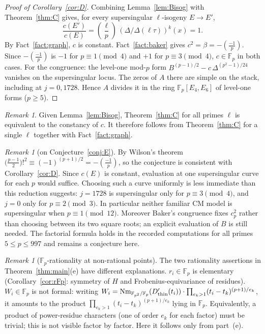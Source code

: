 \documentclass[11pt,a4paper]{article}
\numberwithin{equation}{section}
\theoremstyle{definition}
\theoremstyle{remark}
\newtheorem{remark}[theorem]{Remark}
\newcommand{\Fp}{\mathbb F_p}
\newcommand{\Fq}{\mathbb F_{p^2}}
\newcommand{\Lp}[1]{\left(\frac{#1}{p}\right)}
\begin{document}
\begin{proof}[Proof of Corollary~\ref{cor:D}]
Combining Lemma~\ref{lem:Bisog} with Theorem~\ref{thm:C} gives, for every supersingular
$\ell$-isogeny $E\to E'$,
\[
\frac{c(E')}{c(E)}=\Lp\ell\,(\Delta/\Delta(\ell\tau))^k(x)=1.
\]
By Fact~\ref{fact:graph}, $c$ is constant. Fact~\ref{fact:baker} gives $c^2=\beta=-\Lp{-1}$.
Since $-\Lp{-1}$ is $-1$ for $p\equiv1\pmod4$ and $+1$ for $p\equiv3\pmod4$, $c\in\Fp$ in both cases.
For the congruence: the level-one mod-$p$ form $B^{(p-1)/2}-c\,\Delta^{(p^2-1)/24}$ vanishes on the supersingular locus.
The zeros of $A$ there are simple on the stack, including at $j=0,1728$. Hence $A$ divides it in the ring $\Fp[E_4,E_6]$ of level-one forms ($p\ge5$).
\end{proof}
\begin{remark}
Given Lemma~\ref{lem:Bisog}, Theorem~\ref{thm:C} for all primes $\ell$ is equivalent to the constancy of $c$. It therefore
follows from Theorem~\ref{thm:C} for a single $\ell$ together with Fact~\ref{fact:graph}.
\end{remark}

\begin{remark}[on Conjecture~\ref{conj:E}]
By Wilson's theorem $\bigl(\frac{p-1}2\bigr)!^2\equiv(-1)^{(p+1)/2}=-\Lp{-1}$, so the conjecture is
consistent with Corollary~\ref{cor:D}. Since $c(E)$ is constant, evaluation at
one supersingular curve for each $p$ would suffice. Choosing such a curve
uniformly is less immediate than this reduction suggests: $j=1728$ is
supersingular only for $p\equiv3\pmod4$, and $j=0$ only for
$p\equiv2\pmod3$. In particular neither familiar CM model is supersingular
when $p\equiv1\pmod{12}$. Moreover Baker's congruence fixes $c_p^2$ rather
than choosing between its two square roots; an explicit evaluation of $B$ is
still needed. The factorial formula holds in the recorded computations for all
primes $5\le p\le997$ and remains a conjecture here.
\end{remark}

\begin{remark}[$\Fp$-rationality at non-rational points]
The two rationality assertions in Theorem~\ref{thm:main}(e) have different explanations. $r_i\in\Fp$ is elementary (Corollary~\ref{cor:rFp}: symmetry
of $H$ and Frobenius-equivariance of residues). $W_i\in\Fp$ is not formal: writing
$W_i=\operatorname{Nm}_{\Fq/\Fp}(D_{\rm thin}'(t_i))\cdot\prod_{e_k>1}(t_i-t_k)^{(p+1)/e_k}$, it amounts to the product
$\prod_{e_k>1}(t_i-t_k)^{(p+1)/e_k}$ lying in $\Fp$. Equivalently, a product of power-residue characters (one of order $e_k$ for each factor) must be trivial; this is not visible factor by factor. Here it follows only
from part~(e).
\end{remark}
\end{document}
